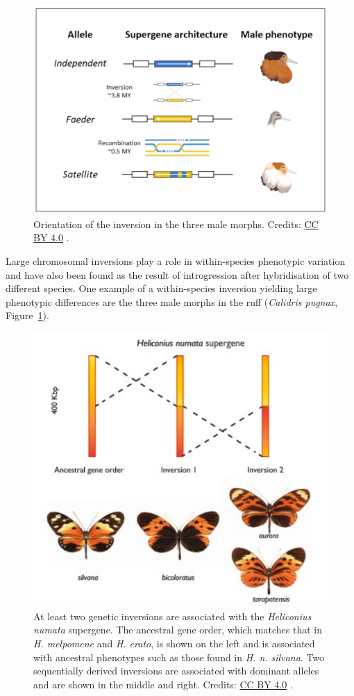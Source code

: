 \begin{figure}[!htbp]
\centering
\includegraphics[width=0.7\linewidth]{files/male-morphs-c29897c340640f26b0227149c9ad8e0c.png}
\caption[]{Orientation of the inversion in the three male morphs.
Credits: \href{https://creativecommons.org/licenses/by/4.0/}{CC BY 4.0} \cite{male_morphs_2022}.}
\label{male_morphs}
\end{figure}

Large chromosomal inversions play a role in within-species phenotypic
variation and have also been found as the result of introgression after
hybridisation of two different species. One example of a within-species
inversion yielding large phenotypic differences are the three male morphs in
the ruff (\textit{Calidris pugnax}, Figure~\ref{male_morphs}).

\begin{figure}[!htbp]
\centering
\includegraphics[width=0.7\linewidth]{files/butterflies-fbc698aca8b71a3df293b54d42f2b5fb.pdf}
\caption[]{At least two genetic inversions are associated with the \textit{Heliconius numata}
supergene. The ancestral gene order, which matches that in \textit{H. melpomene}
and \textit{H. erato}, is shown on the left and is associated with ancestral
phenotypes such as those found in \textit{H. n. silvana}. Two sequentially derived inversions
are associated with dominant alleles and are shown in the middle and right.
Credits: \href{https://creativecommons.org/licenses/by/4.0/}{CC BY 4.0} \cite{butterflies_2017}.}
\label{butterflies}
\end{figure}


